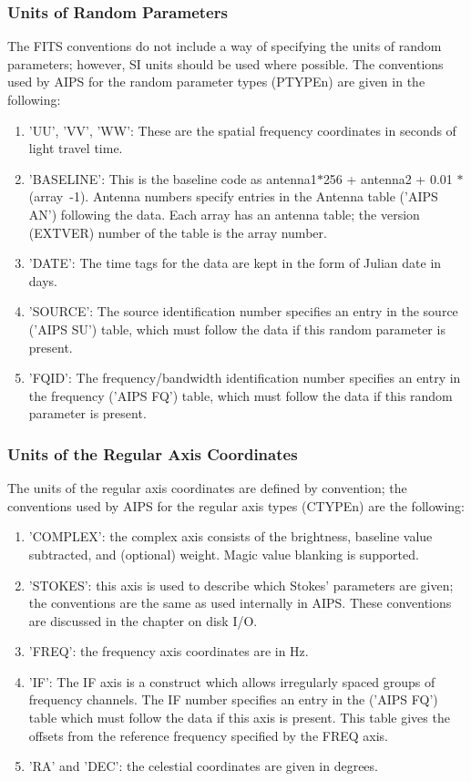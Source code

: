 \subsubsection{Units of Random Parameters }
The FITS conventions do not include a way of specifying the units of
random parameters; however, SI units should be used where possible.
The conventions used by AIPS for the random parameter types (PTYPEn)
are given in the following:
\begin{enumerate} %
\item 'UU', 'VV', 'WW': These are the spatial frequency coordinates in
seconds of light travel time.
\item 'BASELINE': This is the baseline code as antenna1$\ast$256 +
antenna2 + 0.01 $\ast$ (array\ -1).  Antenna numbers specify entries
in the Antenna table ('AIPS AN') following the data.
Each array has an antenna table; the version (EXTVER) number of the
table is the array number.
\item 'DATE': The time tags for the data are kept in the form of Julian date
in days.
\item 'SOURCE': The source identification number specifies an entry in the
source ('AIPS SU') table, which must follow the data
if this random parameter is present.
\item 'FQID': The frequency/bandwidth identification number specifies
an entry in the frequency ('AIPS FQ') table, which
must follow the data if this random parameter is present.

\end{enumerate} %
\subsubsection{Units of the Regular Axis Coordinates }
The units of the regular axis coordinates are defined by convention;
the conventions used by AIPS for the regular axis types (CTYPEn)
are the following:
\begin{enumerate} %
\item 'COMPLEX': the complex axis consists of the brightness, baseline
value subtracted, and (optional) weight.  Magic value blanking is supported.
\item 'STOKES': this axis is used to describe which Stokes' parameters are
given; the conventions are the same as used internally in AIPS.  These
conventions are discussed in the chapter on disk I/O.
\item 'FREQ': the frequency axis coordinates are in Hz.
\item 'IF': The IF axis is a construct which allows irregularly spaced groups
of frequency channels.  The IF number specifies an entry in the ('AIPS
FQ') table which must follow the data if this axis is
present. This table gives the offsets from the reference frequency
specified by the FREQ axis.
\item 'RA' and 'DEC': the celestial coordinates are given in degrees.

\end{enumerate} %
